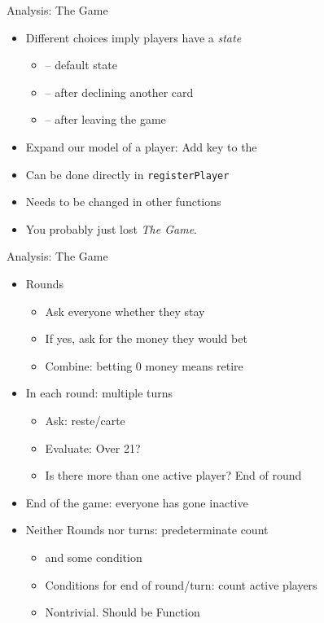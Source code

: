 
\begin{frame}[fragile]{Analysis: The Game}
%
\begin{itemize}
\item Different choices imply players have a \emph{state}
	\begin{itemize}
	\item {} -- default state
	\item {} -- after declining another card
	\item {} -- after leaving the game
	\end{itemize}
\item Expand our model of a player: Add key  to the 
\item Can be done directly in \texttt{registerPlayer}
\item Needs to be changed in other functions
\item You probably just lost \emph{The Game}.
\end{itemize}
%
\end{frame}


\begin{frame}[fragile]{Analysis: The Game}
%
\begin{itemize}
\item Rounds
	\begin{itemize}
	\item Ask everyone whether they stay
	\item If yes, ask for the money they would bet
	\item Combine: betting 0 money means retire
	\end{itemize}
\item In each round: multiple turns
	\begin{itemize}
	\item Ask: reste/carte
	\item Evaluate: Over 21?
	\item Is there more than one active player? \Thus End of round
	\end{itemize}
\item End of the game: everyone has gone inactive
\item Neither Rounds nor turns: predeterminate count
	\begin{itemize}
	\item[\Thus]  and some condition
	\item Conditions for end of round/turn: count active players
	\item Nontrivial. Should be Function
	\end{itemize}
\end{itemize}
%
\end{frame}

